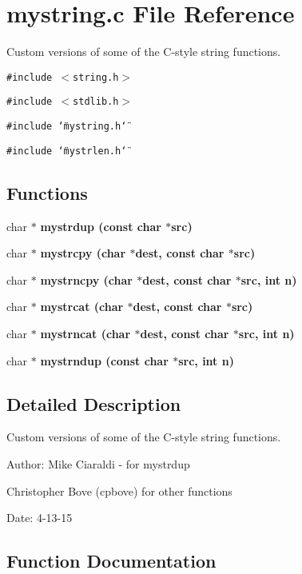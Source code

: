 \section{mystring.c File Reference}
\label{mystring_8c}
Custom versions of some of the C-style string functions. 

{\tt \#include $<$string.h$>$}\par
{\tt \#include $<$stdlib.h$>$}\par
{\tt \#include \char`\"{}mystring.h\char`\"{}}\par
{\tt \#include \char`\"{}mystrlen.h\char`\"{}}\par
\subsection*{Functions}
\begin{CompactItemize}
\item 
char $\ast$ \bf{mystrdup} (const char $\ast$src)
\item 
char $\ast$ \bf{mystrcpy} (char $\ast$dest, const char $\ast$src)
\item 
char $\ast$ \bf{mystrncpy} (char $\ast$dest, const char $\ast$src, int n)
\item 
char $\ast$ \bf{mystrcat} (char $\ast$dest, const char $\ast$src)
\item 
char $\ast$ \bf{mystrncat} (char $\ast$dest, const char $\ast$src, int n)
\item 
char $\ast$ \bf{mystrndup} (const char $\ast$src, int n)
\end{CompactItemize}


\subsection{Detailed Description}
Custom versions of some of the C-style string functions. 

\begin{Desc}
\item[Author:]Mike Ciaraldi - for mystrdup 

Christopher Bove (cpbove) for other functions \end{Desc}
\begin{Desc}
\item[Date:]4-13-15 \end{Desc}


\subsection{Function Documentation}
